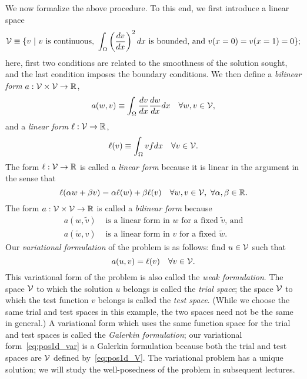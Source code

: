 We now formalize the above procedure. To this end, we first introduce a linear space
\begin{equation}
  \calV \equiv \{ v \ | \
   v \text{ is continuous, } 
   \int_\Omega \left(\dd{v}{x}\right)^2 dx \text{ is bounded, and } %
   v(x=0) = v(x=1) = 0 \};
  \label{eq:pos1d_V}
\end{equation}
here, first two conditions are related to the smoothness of the solution sought, and the last condition imposes the boundary conditions. We then define a \emph{bilinear form} $a: \mathcal{V} \times \mathcal{V} \to \mathbb{R}$,
\begin{equation}
  a(w,v) \equiv \int_{\Omega} \frac{d v}{d x} \frac{d w}{d x} dx \quad \forall w, v \in \mathcal{V},
  \label{eq:pos1d_a}
\end{equation}
and a \emph{linear form} $\ell: \mathcal{V} \to \mathbb{R}$,
\begin{equation}
  \ell(v) \equiv \int_{\Omega} v f dx \quad \forall v \in \mathcal{V}.
  \label{eq:pos1d_ell}
\end{equation}
The form $\ell: \mathcal{V} \to \mathbb{R}$ is called a \emph{linear form} because it is linear in the argument in the sense that
\begin{equation*}
  \ell(\alpha w + \beta v) = \alpha \ell(w) + \beta \ell(v) \quad \forall w,v \in \mathcal{V}, \ \forall \alpha, \beta \in \mathbb{R}.
\end{equation*}
The form $a: \mathcal{V} \times \mathcal{V} \to \mathbb{R}$ is called a \emph{bilinear form} because 
\begin{align*}
  a(w, \tilde v) & \text{ is a linear form in $w$ for a fixed $\tilde v$, and} \\
  a(\tilde w, v) & \text{ is a linear form in $v$ for a fixed $\tilde w$}.
\end{align*}
Our \emph{variational formulation} of the problem is as follows: find $u \in \mathcal{V}$ such that
\begin{equation}
  a(u,v) = \ell(v) \quad \forall v \in \mathcal{V}.
  \label{eq:pos1d_var}
\end{equation}
This variational form of the problem is also called the \emph{weak formulation}.  The space $\mathcal{V}$ to which the solution $u$ belongs is called the \emph{trial space}; the space $\mathcal{V}$ to which the test function $v$ belongs is called the \emph{test space}. (While we choose the same trial and test spaces in this example, the two spaces need not be the same in general.)  A variational form which uses the same function space for the trial and test spaces is called the \emph{Galerkin formulation}; our variational form~\eqref{eq:pos1d_var} is a Galerkin formulation because both the trial and test spaces are $\mathcal{V}$ defined by~\eqref{eq:pos1d_V}. The variational problem has a unique solution; we will study the well-posedness of the problem in subsequent lectures.


